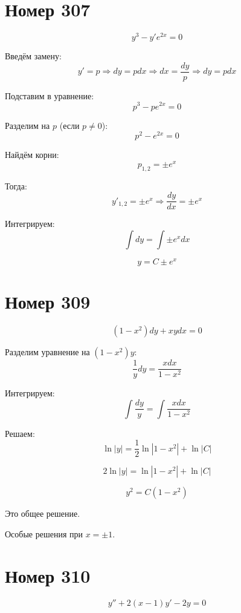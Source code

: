 \section*{Номер 307}

$$ y^3 - y' e^{2x} = 0 $$

\begin{solution}
    Введём замену:
    $$ y' = p \Rightarrow dy = p dx \Rightarrow dx = \frac{dy}{p} \Rightarrow dy = p dx $$

    Подставим в уравнение:
    $$ p^3 - p e^{2x} = 0 $$

    Разделим на $p$ (если $p \neq 0$):
    $$ p^2 - e^{2x} = 0 $$

    Найдём корни:
    $$ p_{1,2} = \pm e^x $$

    Тогда:
    $$ y'_{1,2} = \pm e^x \Rightarrow \frac{dy}{dx} = \pm e^x $$

    Интегрируем:
    $$ \int dy = \int \pm e^x dx $$

    $$ y = C \pm e^x $$
\end{solution}

\section*{Номер 309}

$$ (1 - x^2) dy + xy dx = 0 $$

\begin{solution}
    Разделим уравнение на $(1 - x^2) y$:
    $$ \frac{1}{y} dy = \frac{x dx}{1 - x^2} $$

    Интегрируем:
    $$ \int \frac{dy}{y} = \int \frac{x dx}{1 - x^2} $$

    Решаем:
    $$ \ln |y| = \frac{1}{2} \ln |1 - x^2| + \ln |C| $$

    $$ 2 \ln |y| = \ln |1 - x^2| + \ln |C| $$

    $$ y^2 = C (1 - x^2) $$

    Это общее решение. 

    Особые решения при $ x = \pm 1 $.
\end{solution} \pagebreak

\section*{Номер 310}

$$ y'' + 2(x - 1)y' - 2y = 0 $$

